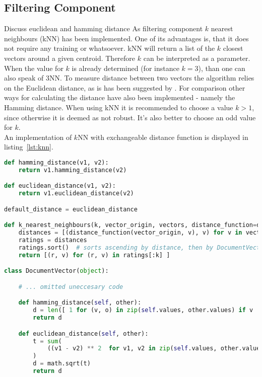 
\subsection{Filtering Component}
\label{sec:filtering-component}
{\color{red}\tiny Discuss euclidean and hamming distance}
As filtering component $k$ nearest neighbours (kNN) has been implemented.
One of its advantages is, that it does not require any training or whatsoever.\citep[p.~290]{manning:2009}
kNN will return a list of the $k$ closest vectors around a given centroid.
Therefore $k$ can be interpreted as a parameter.
When the value for $k$ is already determined (for instance $k=3$), than one can also speak of 3NN.\citep[p.~297-298]{manning:2009}
To measure distance between two vectors the algorithm relies on the Euclidean distance, as is has been suggested by \citeauthor{manning:2009}.\citep[p.~292]{manning:2009}
For comparison other ways for calculating the distance have also been implemented - namely the Hamming distance.
When using kNN it is recommended to choose a value $k > 1$, since otherwise it is deemed as not robust.
It's also better to choose an odd value for $k$.\\
An implementation of $k$NN with exchangeable distance function is displayed in listing~\ref{lst:knn}.

\begin{lstlisting}[language=Python,caption={kNN and distance methods},label={lst:knn},float=h]
def hamming_distance(v1, v2):
    return v1.hamming_distance(v2)

def euclidean_distance(v1, v2):
    return v1.euclidean_distance(v2)

default_distance = euclidean_distance

def k_nearest_neighbours(k, vector_origin, vectors, distance_function=default_distance):
    distances = [(distance_function(vector_origin, v), v) for v in vectors]
    ratings = distances
    ratings.sort()  # sorts ascending by distance, then by DocumentVector
    return [(r, v) for (r, v) in ratings[:k] ]

class DocumentVector(object):

    # ... omitted uneccesary code

    def hamming_distance(self, other):
        d = len([ 1 for (v, o) in zip(self.values, other.values) if v != o ])
        return d

    def euclidean_distance(self, other):
        t = sum(
            ((v1 - v2) ** 2  for v1, v2 in zip(self.values, other.values))
        )
        d = math.sqrt(t)
        return d
\end{lstlisting}

